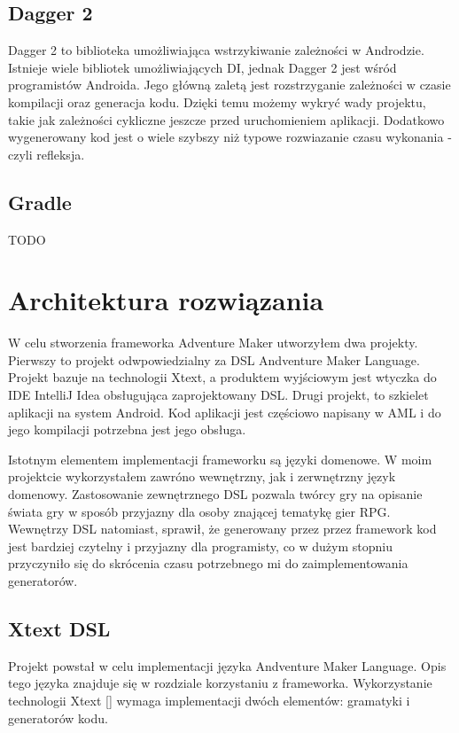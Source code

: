 \documentclass	{xmgr}
\begin{document}
\section{Dagger 2}

Dagger 2 \cite{Dagger2:2017:Doc} to biblioteka umożliwiająca wstrzykiwanie zależności w Androdzie. Istnieje wiele bibliotek umożliwiających DI, jednak Dagger 2 jest wśród programistów Androida. Jego główną zaletą jest rozstrzyganie zależności w czasie kompilacji oraz generacja kodu. Dzięki temu możemy wykryć wady projektu, takie jak zależności cykliczne jeszcze przed uruchomieniem aplikacji. Dodatkowo wygenerowany kod jest o wiele szybszy niż typowe rozwiazanie czasu wykonania - czyli refleksja.

\section{Gradle}
TODO

\chapter{Architektura rozwiązania}
W celu stworzenia frameworka Adventure Maker utworzyłem dwa projekty. Pierwszy to projekt odwpowiedzialny za DSL Andventure Maker Language. Projekt bazuje na technologii Xtext, a produktem wyjściowym jest wtyczka do IDE IntelliJ Idea obsługująca zaprojektowany DSL.
Drugi projekt, to szkielet aplikacji na system Android. Kod aplikacji jest częściowo napisany w AML i do jego kompilacji potrzebna jest jego obsługa.

Istotnym elementem implementacji frameworku są języki domenowe. W moim projektcie wykorzystałem zawróno wewnętrzny, jak i zerwnętrzny język domenowy. Zastosowanie zewnętrznego DSL pozwala twórcy gry na opisanie świata gry w sposób przyjazny dla osoby znającej tematykę gier RPG. Wewnętrzy DSL natomiast, sprawił, że generowany przez przez framework kod jest bardziej czytelny i przyjazny dla programisty, co w dużym stopniu przyczyniło się do skrócenia czasu potrzebnego mi do zaimplementowania generatorów.

\section{Xtext DSL} 
Projekt powstał w celu implementacji języka Andventure Maker Language. Opis tego języka znajduje się w rozdziale korzystaniu z frameworka.
Wykorzystanie technologii Xtext [] wymaga implementacji dwóch elementów: gramatyki i generatorów kodu. 
\end{document}
